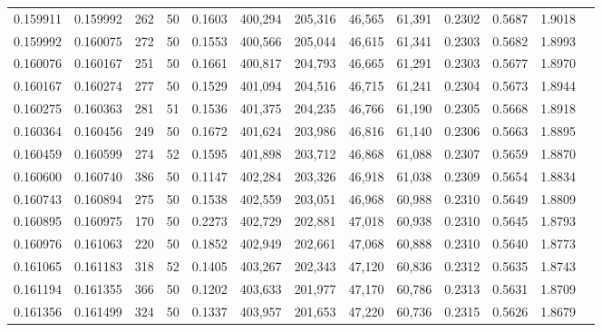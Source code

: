 \begin{tabular}{rrrrrrrrrrrrr}
0.159911 & 0.159992 &   262 &  50 &                                     0.1603 & 400,294 & 205,316 &  46,565 &  61,391 & 0.2302 & 0.5687 & 1.9018 \\
0.159992 & 0.160075 &   272 &  50 &                                     0.1553 & 400,566 & 205,044 &  46,615 &  61,341 & 0.2303 & 0.5682 & 1.8993 \\
0.160076 & 0.160167 &   251 &  50 &                                     0.1661 & 400,817 & 204,793 &  46,665 &  61,291 & 0.2303 & 0.5677 & 1.8970 \\
0.160167 & 0.160274 &   277 &  50 &                                     0.1529 & 401,094 & 204,516 &  46,715 &  61,241 & 0.2304 & 0.5673 & 1.8944 \\
0.160275 & 0.160363 &   281 &  51 &                                     0.1536 & 401,375 & 204,235 &  46,766 &  61,190 & 0.2305 & 0.5668 & 1.8918 \\
0.160364 & 0.160456 &   249 &  50 &                                     0.1672 & 401,624 & 203,986 &  46,816 &  61,140 & 0.2306 & 0.5663 & 1.8895 \\
0.160459 & 0.160599 &   274 &  52 &                                     0.1595 & 401,898 & 203,712 &  46,868 &  61,088 & 0.2307 & 0.5659 & 1.8870 \\
0.160600 & 0.160740 &   386 &  50 &                                     0.1147 & 402,284 & 203,326 &  46,918 &  61,038 & 0.2309 & 0.5654 & 1.8834 \\
0.160743 & 0.160894 &   275 &  50 &                                     0.1538 & 402,559 & 203,051 &  46,968 &  60,988 & 0.2310 & 0.5649 & 1.8809 \\
0.160895 & 0.160975 &   170 &  50 &                                     0.2273 & 402,729 & 202,881 &  47,018 &  60,938 & 0.2310 & 0.5645 & 1.8793 \\
0.160976 & 0.161063 &   220 &  50 &                                     0.1852 & 402,949 & 202,661 &  47,068 &  60,888 & 0.2310 & 0.5640 & 1.8773 \\
0.161065 & 0.161183 &   318 &  52 &                                     0.1405 & 403,267 & 202,343 &  47,120 &  60,836 & 0.2312 & 0.5635 & 1.8743 \\
0.161194 & 0.161355 &   366 &  50 &                                     0.1202 & 403,633 & 201,977 &  47,170 &  60,786 & 0.2313 & 0.5631 & 1.8709 \\
0.161356 & 0.161499 &   324 &  50 &                                     0.1337 & 403,957 & 201,653 &  47,220 &  60,736 & 0.2315 & 0.5626 & 1.8679 \\

\end{tabular}
